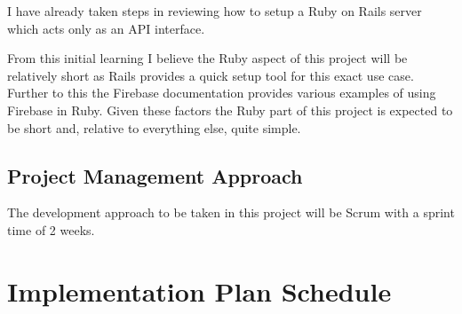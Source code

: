 I have already taken steps in reviewing how to setup a Ruby on Rails server which acts only as an API interface. 

From this initial learning I believe the Ruby aspect of this project will be relatively short as Rails provides a quick setup tool for this exact use case. Further to this the Firebase documentation provides various examples of using Firebase in Ruby. Given these factors the Ruby part of this project is expected to be short and, relative to everything else, quite simple.

\subsection{Project Management Approach}

The development approach to be taken in this project will be Scrum with a sprint time of 2 weeks.

\section{Implementation Plan Schedule}
\label{section:implementationplan}

